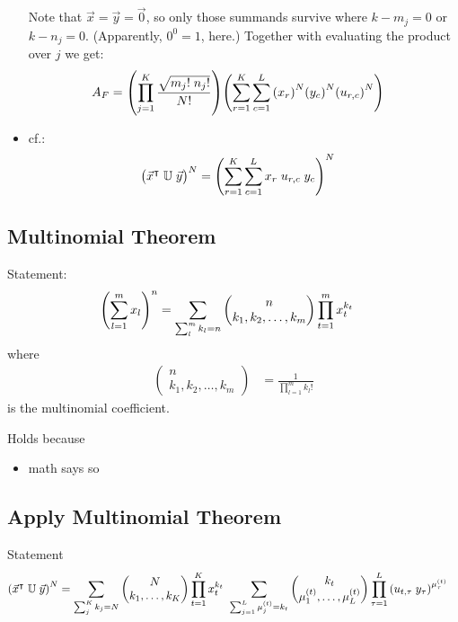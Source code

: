 \documentclass[
	english,
	a4paper,
	fontsize=10pt,
	parskip=half,
	titlepage=true,
	DIV=12,
	final
]{scrreprt}
\newcommand*{\transp}{\ensuremath{^\intercal}}
\begin{document}
\begin{itemize}
Note that $\vec{x} = \vec{y} = \vec{0}$, so only those summands survive where $k - m_j = 0$ or $k - n_j = 0$. (Apparently, $0^0 = 1$, here.) Together with evaluating the product over $j$ we get:
\begin{align}
	A_F
&=
	\qty(
		\prod_{j=1}^{K}
			\frac
				{\sqrt{m_j! \; n_j!}}
				{N!}
	)
	\qty( 
		\sum_{r=1}^{K}
		\sum_{c=1}^{L}
			\qty(x_r)^{N}
			\qty(y_c)^{N}
			\qty(u_{r,c})^{N}
	)
\end{align}

\item cf.:
\begin{align*}
	\qty( \big. \vec{x}\transp \; \mathbb{U} \; \vec{y} )^{N}
&=
	\qty( 
			\sum_{r=1}^{K}
			\sum_{c=1}^{L}
			x_r \; u_{r,c} \; y_c
		)^{N}
\end{align*}

\end{itemize}

\subsection{Multinomial Theorem}
Statement:
\begin{align}
	\qty(
		\sum_{l=1}^{m} x_l
	)^{n}
&=
	\sum_{\sum_l^m k_l = n}
	\begin{pmatrix}
		n \\ k_1, k_2, \ldots, k_m
	\end{pmatrix}
	\prod_{t=1}^{m}
		x_t^{k_t}
\end{align}
where
\begin{align}
	\begin{pmatrix}
		n \\ k_1, k_2, \ldots, k_m
	\end{pmatrix}
&=
	\frac{1}
	{\prod_{l=1}^m k_l !}
\end{align}
is the multinomial coefficient.

Holds because
\begin{itemize}
\item math says so
\end{itemize}

\subsection{Apply Multinomial Theorem}
Statement
\begin{align}
	\qty( \vec{x}\transp \; \mathbb{U} \; \vec{y} )^{N}
&=
	\sum_{\sum_j^K k_j = N}
		\begin{pmatrix}
			N \\ k_1, \ldots, k_K
		\end{pmatrix}
		\prod_{t=1}^K
			x_t^{k_t} ~
			\sum_{\sum_{j=1}^{L} \mu_j^{(t)} = k_t}
				\begin{pmatrix}
					k_t \\ \mu_1^{(t)}, \ldots, \mu_L^{(t)}
				\end{pmatrix}
				\prod_{\tau=1}^{L}
					\qty(
						u_{t, \tau} \; y_\tau
					)^{\mu_\tau^{(t)}}
\end{align}
\end{document}
